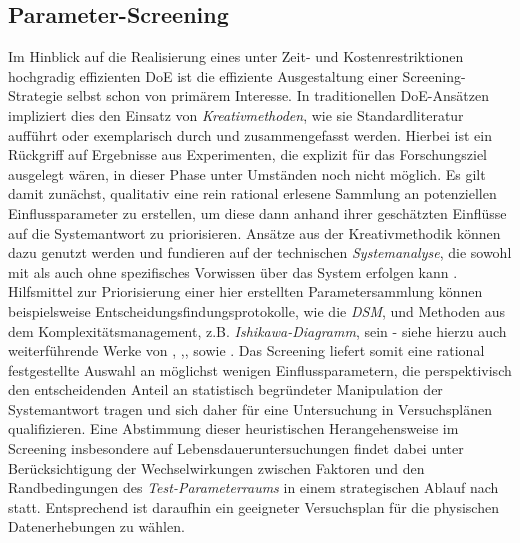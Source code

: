 \subsection{Parameter-Screening} \label{subsec:screening}
Im Hinblick auf die Realisierung eines unter Zeit- und Kostenrestriktionen hochgradig effizienten \ac{DoE} ist die effiziente Ausgestaltung einer Screening-Strategie selbst schon von primärem Interesse.
In traditionellen \ac{DoE}-Ansätzen impliziert dies den Einsatz von \textit{Kreativmethoden}, wie sie Standardliteratur \cite{Montgomery.2020} aufführt oder exemplarisch durch \textcite{Kremer.2021} und \textcite{Gundlach.2004} zusammengefasst werden.
Hierbei ist ein Rückgriff auf Ergebnisse aus Experimenten, die explizit für das Forschungsziel ausgelegt wären, in dieser Phase unter Umständen noch nicht möglich.
Es gilt damit zunächst, qualitativ eine rein rational erlesene Sammlung an potenziellen Einflussparameter zu erstellen, um diese dann anhand ihrer geschätzten Einflüsse auf die Systemantwort zu priorisieren.
Ansätze aus der Kreativmethodik können dazu genutzt werden und fundieren auf der technischen \textit{Systemanalyse}, die sowohl mit als auch ohne spezifisches Vorwissen über das System erfolgen kann \cite{Bertsche.2022}.
Hilfsmittel zur Priorisierung einer hier erstellten Parametersammlung können beispielsweise Entscheidungsfindungsprotokolle, wie die \textit{\ac{DSM}}, und Methoden aus dem Komplexitätsmanagement, z.B. \textit{Ishikawa-Diagramm}, sein - siehe hierzu auch weiterführende Werke von \textcite{Mayers.1997}, \textcite{Pahl.2007},\textcite{Wu.2021},\textcite{Daenzer.2002} sowie \textcite{Lindemann.2008}.
Das Screening liefert somit eine rational festgestellte Auswahl an möglichst wenigen Einflussparametern, die perspektivisch den entscheidenden Anteil an statistisch begründeter Manipulation der Systemantwort tragen und sich daher für eine Untersuchung in Versuchsplänen qualifizieren.
Eine Abstimmung dieser heuristischen Herangehensweise im Screening insbesondere auf Lebensdaueruntersuchungen findet dabei unter Berücksichtigung der Wechselwirkungen zwischen Faktoren und den Randbedingungen des \textit{Test-Parameterraums} in einem strategischen Ablauf nach \cite{Arndt.2023c} statt.
Entsprechend ist daraufhin ein geeigneter Versuchsplan für die physischen Datenerhebungen zu wählen.

